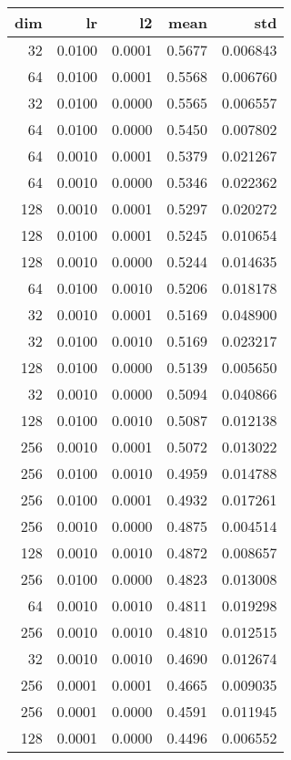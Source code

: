 \begin{tabular}{rrrrr}
\toprule
 dim &      lr &      l2 &    mean &       std \\
\midrule
  32 &  0.0100 &  0.0001 &  0.5677 &  0.006843 \\
  64 &  0.0100 &  0.0001 &  0.5568 &  0.006760 \\
  32 &  0.0100 &  0.0000 &  0.5565 &  0.006557 \\
  64 &  0.0100 &  0.0000 &  0.5450 &  0.007802 \\
  64 &  0.0010 &  0.0001 &  0.5379 &  0.021267 \\
  64 &  0.0010 &  0.0000 &  0.5346 &  0.022362 \\
 128 &  0.0010 &  0.0001 &  0.5297 &  0.020272 \\
 128 &  0.0100 &  0.0001 &  0.5245 &  0.010654 \\
 128 &  0.0010 &  0.0000 &  0.5244 &  0.014635 \\
  64 &  0.0100 &  0.0010 &  0.5206 &  0.018178 \\
  32 &  0.0010 &  0.0001 &  0.5169 &  0.048900 \\
  32 &  0.0100 &  0.0010 &  0.5169 &  0.023217 \\
 128 &  0.0100 &  0.0000 &  0.5139 &  0.005650 \\
  32 &  0.0010 &  0.0000 &  0.5094 &  0.040866 \\
 128 &  0.0100 &  0.0010 &  0.5087 &  0.012138 \\
 256 &  0.0010 &  0.0001 &  0.5072 &  0.013022 \\
 256 &  0.0100 &  0.0010 &  0.4959 &  0.014788 \\
 256 &  0.0100 &  0.0001 &  0.4932 &  0.017261 \\
 256 &  0.0010 &  0.0000 &  0.4875 &  0.004514 \\
 128 &  0.0010 &  0.0010 &  0.4872 &  0.008657 \\
 256 &  0.0100 &  0.0000 &  0.4823 &  0.013008 \\
  64 &  0.0010 &  0.0010 &  0.4811 &  0.019298 \\
 256 &  0.0010 &  0.0010 &  0.4810 &  0.012515 \\
  32 &  0.0010 &  0.0010 &  0.4690 &  0.012674 \\
 256 &  0.0001 &  0.0001 &  0.4665 &  0.009035 \\
 256 &  0.0001 &  0.0000 &  0.4591 &  0.011945 \\
 128 &  0.0001 &  0.0000 &  0.4496 &  0.006552 \\

\end{tabular}

